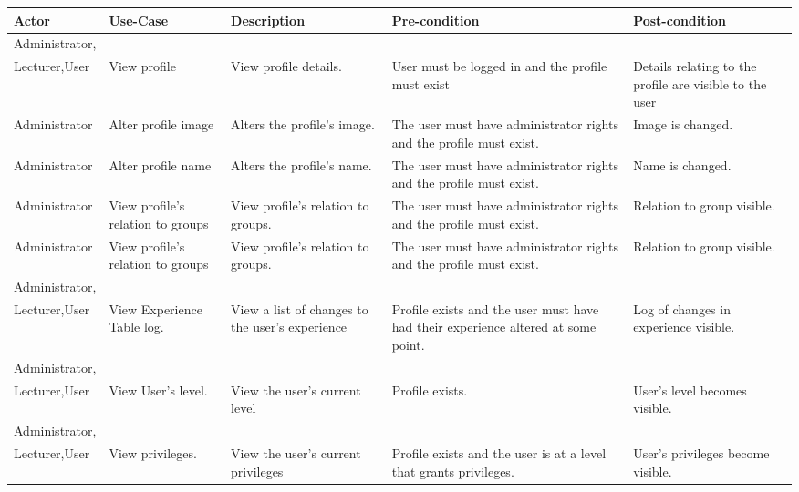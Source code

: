 \documentclass[a4paper]{article}
\begin{document}
\begin{table}
\begin{tabular}{p{3cm}p{3cm}p{3cm}p{3cm}p{3cm}}
\hline
Actor & Use-Case & 
Description & Pre-condition & Post-condition \\ \hline

Administrator,\\Lecturer,User & View profile & View profile details. & User must be logged in and the profile must exist & Details relating to the profile are visible to the user\\ \hline

Administrator & Alter profile image & Alters the profile's image. & The user must have administrator rights and the profile must exist. & Image is changed.\\ \hline

Administrator & Alter profile name & Alters the profile's name. & The user must have administrator rights and the profile must exist. & Name is changed.\\ \hline

Administrator & View profile's relation to groups & View profile's relation to groups. & The user must have administrator rights and the profile must exist. & Relation to group visible.\\ \hline

Administrator & View profile's relation to groups & View profile's relation to groups. & The user must have administrator rights and the profile must exist. & Relation to group visible.\\ \hline

Administrator,\\Lecturer,User & View Experience Table log. & View a list of changes to the user's experience & Profile exists and the user must have had their experience altered at some point. & Log of changes in experience visible.\\ \hline

Administrator,\\Lecturer,User & View User's level. & View the user's current level & Profile exists. & User's level becomes visible.\\ \hline

Administrator,\\Lecturer,User & View privileges. & View the user's current privileges & Profile exists and the user is at a level that grants privileges. & User's privileges become visible.\\ \hline


\end{tabular}
\end{table}
\end{document}
